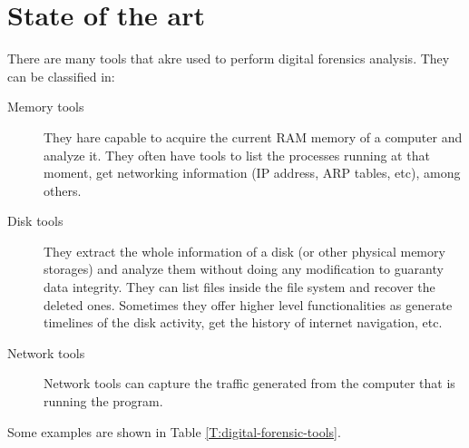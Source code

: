 \chapter{State of the art}
\label{S:state-of-the-art}

There are many tools that akre used to perform digital forensics analysis. They
can be classified in: 

\begin{description}
	\item[Memory tools] They hare capable to acquire the current RAM memory of
	a computer and analyze it. They often have tools to list the processes
	running at that moment, get networking information (IP address, ARP tables,
	etc), among others.

	\item[Disk tools] They extract the whole information of a disk (or other
	physical memory storages) and analyze them without doing any modification
	to guaranty data integrity. They can list files inside the file system and
	recover the deleted ones. Sometimes they offer higher level functionalities 
	as generate timelines of the disk activity, get the history of internet
	navigation, etc.

	\item[Network tools] Network tools can capture the traffic generated from 
	the computer that is running the program.
\end{description}

Some examples are shown in Table \ref{T:digital-forensic-tools}.

